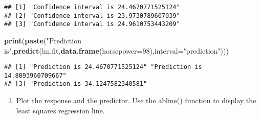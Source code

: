 \documentclass[]{article}
\newenvironment{Shaded}{\begin{snugshade}}{\end{snugshade}}
\newcommand{\KeywordTok}[1]{\textcolor[rgb]{0.13,0.29,0.53}{\textbf{#1}}}
\newcommand{\DataTypeTok}[1]{\textcolor[rgb]{0.13,0.29,0.53}{#1}}
\newcommand{\DecValTok}[1]{\textcolor[rgb]{0.00,0.00,0.81}{#1}}
\newcommand{\StringTok}[1]{\textcolor[rgb]{0.31,0.60,0.02}{#1}}
\newcommand{\NormalTok}[1]{#1}
\providecommand{\tightlist}{%
  \setlength{\itemsep}{0pt}\setlength{\parskip}{0pt}}
\begin{document}
\begin{verbatim}
## [1] "Confidence interval is 24.4670771525124"
## [2] "Confidence interval is 23.9730789607039"
## [3] "Confidence interval is 24.9610753443209"
\end{verbatim}

\begin{Shaded}
\begin{Highlighting}[]
\KeywordTok{print}\NormalTok{(}\KeywordTok{paste}\NormalTok{(}\StringTok{"Prediction is"}\NormalTok{,}\KeywordTok{predict}\NormalTok{(lm.fit,}\KeywordTok{data.frame}\NormalTok{(}\DataTypeTok{horsepower=}\DecValTok{98}\NormalTok{),}\DataTypeTok{interval=}\StringTok{"prediction"}\NormalTok{)))}
\end{Highlighting}
\end{Shaded}

\begin{verbatim}
## [1] "Prediction is 24.4670771525124" "Prediction is 14.8093960709667"
## [3] "Prediction is 34.1247582340581"
\end{verbatim}

\begin{enumerate}
\def\labelenumi{(\alph{enumi})}
\setcounter{enumi}{1}
\tightlist
\item
  Plot the response and the predictor. Use the abline() function to
  display the least squares regression line.
\end{enumerate}
\end{document}
